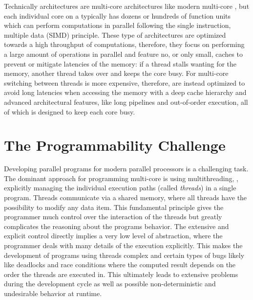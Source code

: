 Technically \GPU architectures are multi-core architectures like modern multi-core \CPUs, but each individual core on a \GPU typically has dozens or hundreds of function units which can perform computations in parallel following the single instruction, multiple data (SIMD) principle.
These type of architectures are optimized towards a high throughput of computations, therefore, they focus on performing a large amount of operations in parallel and feature no, or only small, caches to prevent or mitigate latencies of the memory:
if a thread stalls wanting for the memory, another thread takes over and keeps the core busy.
For multi-core \CPUs switching between threads is more expensive, therefore, \CPUs are instead optimized to avoid long latencies when accessing the memory with a deep cache hierarchy and advanced architectural features, like long pipelines and out-of-order execution, all of which is designed to keep each core busy.

\section{The Programmability Challenge}

Developing parallel programs for modern parallel processors is a challenging task.
The dominant approach for programming multi-core \CPUs is using multithreading, \ie, explicitly managing the individual execution paths (called \emph{threads}) in a single program.
Threads communicate via a shared memory, where all threads have the possibility to modify any data item.
This fundamental principle gives the programmer much control over the interaction of the threads but greatly complicates the reasoning about the programs behavior.
The extensive and explicit control directly implies a very low level of abstraction, where the programmer deals with many details of the execution explicitly.
This makes the development of programs using threads complex and certain types of bugs likely like deadlocks and race conditions where the computed result depends on the order the threads are executed in.
This ultimately leads to extensive problems during the development cycle as well as possible non-deterministic and undesirable behavior at runtime.

